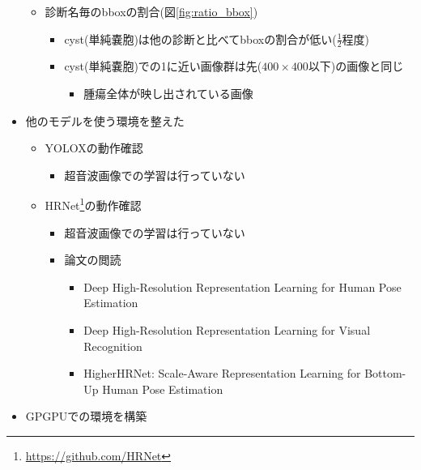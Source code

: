 \documentclass[a4j]{ujarticle}
\newcommand{\Fref}[1]{\mbox{図\ref{fig:#1}}}
\begin{document}
\begin{itemize}
\begin{itemize}
                \item 診断名毎のbboxの割合(\Fref{ratio_bbox})
                \begin{itemize}
                    \item cyst(単純嚢胞)は他の診断と比べてbboxの割合が低い($\displaystyle \frac{1}{2}$程度)
                    \item cyst(単純嚢胞)での1に近い画像群は先($400 \times 400$以下)の画像と同じ
                    \begin{itemize}
                        \item 腫瘍全体が映し出されている画像
                    \end{itemize}
                \end{itemize}
            \end{itemize}
            \item 他のモデルを使う環境を整えた
            \begin{itemize}
                \item YOLOXの動作確認
                \begin{itemize}
                    \item 超音波画像での学習は行っていない
                \end{itemize}
                \item HRNet\footnote{\url{https://github.com/HRNet}}の動作確認
                \begin{itemize}
                    \item 超音波画像での学習は行っていない
                    \item 論文の閲読
                    \begin{itemize}
                        \item Deep High-Resolution Representation Learning for Human Pose Estimation \cite{hrnet}
                        \item Deep High-Resolution Representation Learning for Visual Recognition \cite{recognition}
                        \item HigherHRNet: Scale-Aware Representation Learning for Bottom-Up Human Pose Estimation \cite{bottom}
                    \end{itemize}
                \end{itemize}
            \end{itemize}
            \item GPGPUでの環境を構築
        \end{itemize}
    
\end{document}
